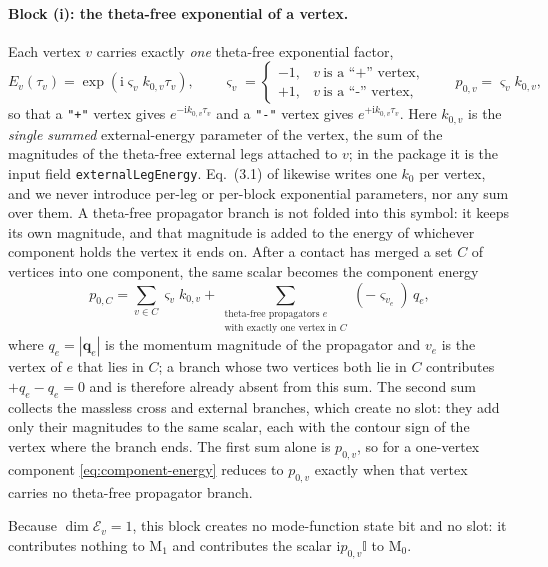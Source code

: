 \documentclass[11pt,a4paper]{article}
\newcommand{\ii}{\mathrm i}
\newcommand{\Id}{\mathbb I}
\newcommand{\cE}{\mathcal E}
\begin{document}
\paragraph{Block (i): the theta-free exponential of a vertex.}
Each vertex $v$ carries exactly \emph{one} theta-free exponential factor,
\begin{equation}
  E_v(\tau_v)=\exp\!\left(\ii\varsigma_v k_{0,v}\tau_v\right),
  \qquad
  \varsigma_v=\begin{cases}-1,&v\ \text{is a ``+'' vertex},\\[2pt]
  +1,&v\ \text{is a ``-'' vertex},\end{cases}
  \qquad p_{0,v}=\varsigma_vk_{0,v},
  \label{eq:phase-block}
\end{equation}
so that a \texttt{"+"} vertex gives $e^{-\ii k_{0,v}\tau_v}$ and a \texttt{"-"} vertex gives
$e^{+\ii k_{0,v}\tau_v}$. Here $k_{0,v}$ is the
\emph{single summed} external-energy parameter of the vertex, the sum of the magnitudes of the theta-free
external legs attached to $v$; in the package it is the input field \texttt{externalLegEnergy}.
Eq.~(3.1) of \cite{Chen:2023iix}
likewise writes one $k_0$ per vertex, and we never introduce per-leg or per-block
exponential parameters, nor any sum over them. A theta-free propagator branch is not folded into
this symbol: it keeps its own magnitude, and that magnitude is added to the energy of whichever
component holds the vertex it ends on. After a contact has merged a set $C$ of vertices
into one component, the same scalar becomes the component energy
\begin{equation}
  p_{0,C}=\sum_{v\in C}\varsigma_vk_{0,v}
  +\!\!\sum_{\substack{\text{theta-free propagators }e\\[-1pt]
  \text{with exactly one vertex in }C}}\!\!(-\varsigma_{v_e})\,q_e,
  \label{eq:component-energy}
\end{equation}
where $q_e=|\bm q_e|$ is the momentum magnitude of the propagator and $v_e$ is the vertex of $e$ that
lies in $C$; a branch whose two vertices both lie in $C$ contributes $+q_e-q_e=0$ and is therefore
already absent from this sum. The
second sum collects the massless cross and external branches, which create no slot: they add only
their magnitudes to the same scalar, each with the contour sign of the vertex where the branch ends. The
first sum alone is $p_{0,v}$, so for a one-vertex component \eqref{eq:component-energy} reduces to
$p_{0,v}$ exactly when that vertex carries no theta-free propagator branch.

Because $\dim\cE_v=1$, this block creates no mode-function state bit and no slot: it contributes nothing to
$\text{M}_1$ and contributes the scalar $\ii p_{0,v}\Id$ to $\text{M}_0$.
\end{document}
